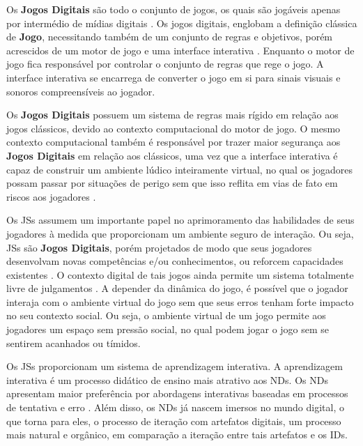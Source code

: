 Os \textbf{Jogos Digitais} são todo o conjunto de jogos, os quais são jogáveis apenas por intermédio de mídias digitais \cite{lucchese2009conceituaccao}. Os jogos digitais, englobam a definição clássica de \textbf{Jogo}, necessitando também de um conjunto de regras e objetivos, porém acrescidos de um motor de jogo e uma interface interativa \cite{battaiola2000jogos}. Enquanto o motor de jogo fica responsável por controlar o conjunto de regras que rege o jogo. A interface interativa se encarrega de converter o jogo em si para sinais visuais e sonoros compreensíveis ao jogador.

Os \textbf{Jogos Digitais}  possuem um sistema de regras mais rígido em relação aos jogos clássicos, devido ao contexto computacional do motor de jogo. O mesmo contexto computacional também é responsável por trazer maior segurança aos \textbf{Jogos Digitais}  em relação aos clássicos, uma vez que a interface interativa é capaz de construir um ambiente lúdico inteiramente virtual, no qual os jogadores possam passar por situações de perigo sem que isso reflita em vias de fato em riscos aos jogadores \cite{lucchese2009conceituaccao}.

Os \acp{JS} assumem um importante papel no aprimoramento das habilidades de seus jogadores à medida que proporcionam um ambiente seguro de interação. Ou seja, \acp{JS} são \textbf{Jogos Digitais}, porém projetados de modo que seus jogadores desenvolvam novas competências e/ou conhecimentos, ou reforcem capacidades existentes \cite{boller2017play}. O contexto digital de tais jogos ainda permite um sistema totalmente livre de julgamentos \cite{unesco2018international}. A depender da dinâmica do jogo, é possível que o jogador interaja com o ambiente virtual do jogo sem que seus erros tenham forte impacto no seu contexto social. Ou seja, o ambiente virtual de um jogo permite aos jogadores um espaço sem pressão social, no qual podem jogar o jogo sem se sentirem acanhados ou tímidos.

Os \acp{JS} proporcionam um sistema de aprendizagem interativa. A aprendizagem interativa é um processo didático de ensino mais atrativo aos \acfp{ND}. Os \acp{ND} apresentam maior preferência por abordagens interativas baseadas em processos de tentativa e erro \cite{pescador2010tecnologias}. Além disso, os \acp{ND} já nascem imersos no mundo digital, o que torna para eles, o processo de iteração com artefatos digitais, um processo mais natural e orgânico, em comparação a iteração entre tais artefatos e os \acfp{ID}.

